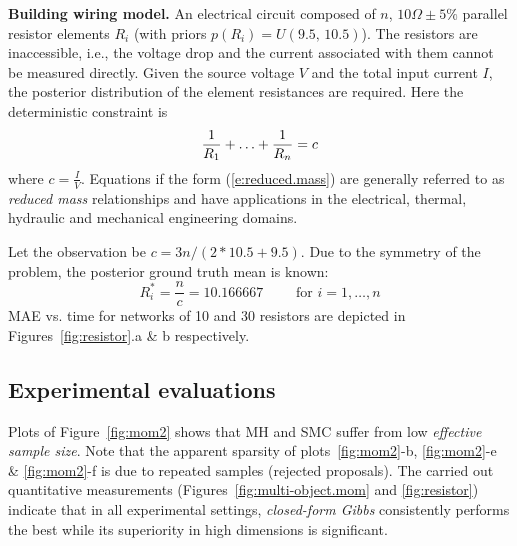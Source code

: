 \documentclass[letterpaper]{article}
\newcommand{\pr}{p}
\begin{document}
\noindent
{\bf Building wiring model. } 
An electrical circuit composed of $n$, $10\Omega\pm5\%$ parallel resistor elements $R_i$
(with priors $\pr(R_i) = U(9.5, \, 10.5)$).
The resistors are inaccessible, i.e., the voltage drop and the current associated with them cannot be measured directly.
Given the source voltage $V$ and the total input current $I$, the posterior distribution of the element resistances are required.
Here the deterministic constraint is 
\begin{equation} \footnotesize 
\label{e:reduced.mass}
 \frac{1}{R_1} + \ldots + \frac{1}{R_n} = c
\end{equation}
where $c = \frac{I}{V}$.
Equations if the form (\ref{e:reduced.mass}) are generally referred to as \emph{reduced mass} relationships and 
have applications in the electrical, thermal, hydraulic and mechanical engineering domains.

Let the observation be $c = {3n}/{(2*10.5 + 9.5)}$.
Due to the symmetry of the problem, the posterior ground truth mean is known:
\begin{equation*}
R_i^* = \frac{n}{c} = 10.166667\qquad \text{ for } i = 1, \ldots, n
\end{equation*}
MAE vs. time for networks of 10 and 30 resistors are depicted in 
Figures~\ref{fig:resistor}.a \& b respectively.

\subsection{Experimental evaluations}
Plots of Figure~\ref{fig:mom2} shows that MH and SMC suffer from low \emph{effective sample size}. 
Note that the apparent sparsity of plots~\ref{fig:mom2}-b, \ref{fig:mom2}-e \& \ref{fig:mom2}-f is due to repeated samples (rejected proposals).
%
The carried out quantitative measurements 
(Figures~\ref{fig:multi-object.mom} and \ref{fig:resistor}) 
indicate that in all experimental settings,
\emph{closed-form Gibbs} consistently performs the best while its superiority in high dimensions is significant.
\end{document}
